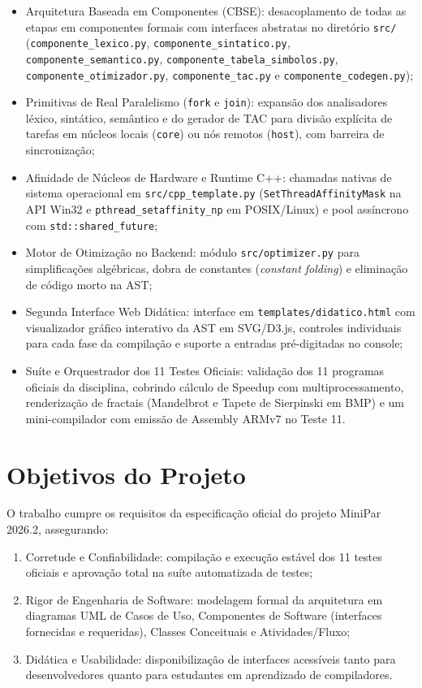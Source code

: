 \begin{itemize}
    \item Arquitetura Baseada em Componentes (CBSE): desacoplamento de todas as etapas em componentes formais com interfaces abstratas no diretório \texttt{src/} (\texttt{componente\_lexico.py}, \texttt{componente\_sintatico.py}, \texttt{componente\_semantico.py}, \texttt{componente\_tabela\_simbolos.py}, \texttt{componente\_otimizador.py}, \texttt{componente\_tac.py} e \texttt{componente\_codegen.py});
    \item Primitivas de Real Paralelismo (\texttt{fork} e \texttt{join}): expansão dos analisadores léxico, sintático, semântico e do gerador de TAC para divisão explícita de tarefas em núcleos locais (\texttt{core}) ou nós remotos (\texttt{host}), com barreira de sincronização;
    \item Afinidade de Núcleos de Hardware e Runtime C++: chamadas nativas de sistema operacional em \texttt{src/cpp\_template.py} (\texttt{SetThreadAffinityMask} na API Win32 e \texttt{pthread\_setaffinity\_np} em POSIX/Linux) e pool assíncrono com \texttt{std::shared\_future};
    \item Motor de Otimização no Backend: módulo \texttt{src/optimizer.py} para simplificações algébricas, dobra de constantes (\textit{constant folding}) e eliminação de código morto na AST;
    \item Segunda Interface Web Didática: interface em \texttt{templates/didatico.html} com visualizador gráfico interativo da AST em SVG/D3.js, controles individuais para cada fase da compilação e suporte a entradas pré-digitadas no console;
    \item Suíte e Orquestrador dos 11 Testes Oficiais: validação dos 11 programas oficiais da disciplina, cobrindo cálculo de Speedup com multiprocessamento, renderização de fractais (Mandelbrot e Tapete de Sierpinski em BMP) e um mini-compilador com emissão de Assembly ARMv7 no Teste 11.
\end{itemize}

\section{Objetivos do Projeto}

O trabalho cumpre os requisitos da especificação oficial do projeto MiniPar 2026.2, assegurando:
\begin{enumerate}
    \item Corretude e Confiabilidade: compilação e execução estável dos 11 testes oficiais e aprovação total na suíte automatizada de testes;
    \item Rigor de Engenharia de Software: modelagem formal da arquitetura em diagramas UML de Casos de Uso, Componentes de Software (interfaces fornecidas e requeridas), Classes Conceituais e Atividades/Fluxo;
    \item Didática e Usabilidade: disponibilização de interfaces acessíveis tanto para desenvolvedores quanto para estudantes em aprendizado de compiladores.
\end{enumerate}

